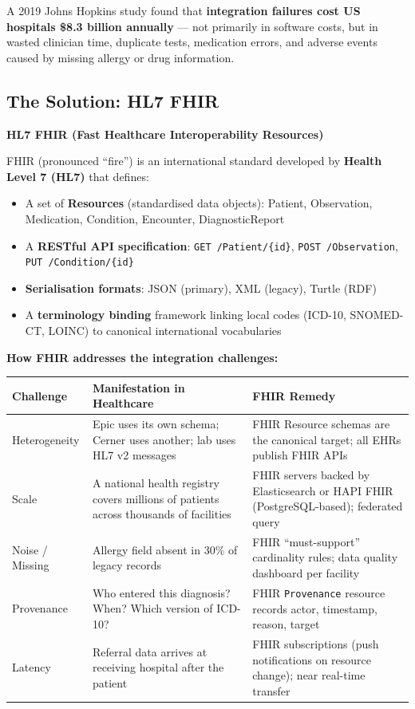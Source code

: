 \documentclass[12pt,a4paper]{article}
\newcommand{\defbox}[2]{%
  \noindent
  \colorbox{PUNavy!12}{%
    \begin{minipage}{\dimexpr\linewidth-2\fboxsep}
      \vspace{4pt}\textbf{\textcolor{PUNavy}{#1}}\par\vspace{2pt}
      #2\vspace{4pt}
    \end{minipage}%
  }\par\vspace{6pt}%
}
\begin{document}
A 2019 Johns Hopkins study found that \textbf{integration failures cost US hospitals \$8.3 billion annually} --- not primarily in software costs, but in wasted clinician time, duplicate tests, medication errors, and adverse events caused by missing allergy or drug information.

\subsection{The Solution: HL7 FHIR}

\defbox{HL7 FHIR (Fast Healthcare Interoperability Resources)}{FHIR (pronounced ``fire'') is an international standard developed by \textbf{Health Level 7 (HL7)} that defines:
\begin{itemize}[nosep, leftmargin=1.5em, after=\vspace{2pt}]
  \item A set of \textbf{Resources} (standardised data objects): Patient, Observation, Medication, Condition, Encounter, DiagnosticReport
  \item A \textbf{RESTful API specification}: \texttt{GET /Patient/\{id\}}, \texttt{POST /Observation}, \texttt{PUT /Condition/\{id\}}
  \item \textbf{Serialisation formats}: JSON (primary), XML (legacy), Turtle (RDF)
  \item A \textbf{terminology binding} framework linking local codes (ICD-10, SNOMED-CT, LOINC) to canonical international vocabularies
\end{itemize}}

\textbf{How FHIR addresses the integration challenges:}

\begin{center}
\renewcommand{\arraystretch}{1.5}
\begin{tabular}{p{2.8cm}p{5.0cm}p{4.5cm}}
  \toprule
  \textbf{Challenge} & \textbf{Manifestation in Healthcare} & \textbf{FHIR Remedy} \\
  \midrule
  Heterogeneity & Epic uses its own schema; Cerner uses another; lab uses HL7 v2 messages & FHIR Resource schemas are the canonical target; all EHRs publish FHIR APIs \\
  Scale & A national health registry covers millions of patients across thousands of facilities & FHIR servers backed by Elasticsearch or HAPI FHIR (PostgreSQL-based); federated query \\
  Noise / Missing & Allergy field absent in 30\% of legacy records & FHIR ``must-support'' cardinality rules; data quality dashboard per facility \\
  Provenance & Who entered this diagnosis?  When?  Which version of ICD-10? & FHIR \texttt{Provenance} resource records actor, timestamp, reason, target \\
  Latency & Referral data arrives at receiving hospital after the patient & FHIR subscriptions (push notifications on resource change); near real-time transfer \\
  \bottomrule
\end{tabular}
\end{center}
\end{document}
